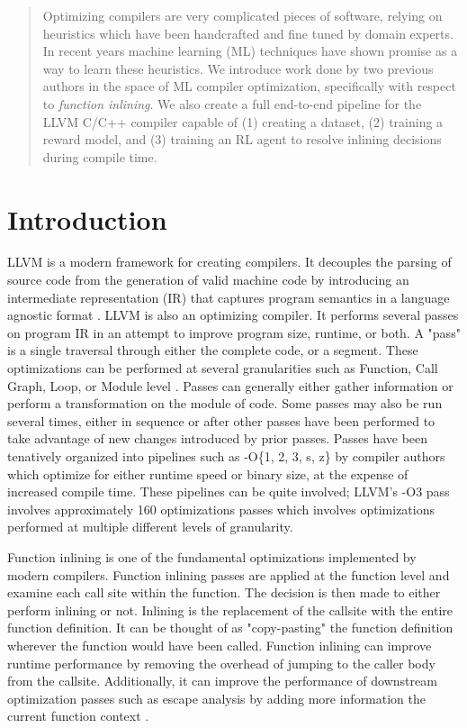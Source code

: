 \documentclass[nohyperref]{article}
\theoremstyle{plain}
\theoremstyle{definition}
\theoremstyle{remark}
\begin{document}
\begin{abstract}
    Optimizing compilers are very complicated pieces of software, relying on heuristics which have been handcrafted and fine tuned by domain experts. In recent years machine learning (ML) techniques have shown promise as a way to learn these heuristics. We introduce work done by two previous authors in the space of ML compiler optimization, specifically with respect to \emph{function inlining}. We also create a full end-to-end pipeline for the LLVM C/C++ compiler capable of (1) creating a dataset, (2) training a reward model, and (3) training an RL agent to resolve inlining decisions during compile time.

\end{abstract}

\section{Introduction}
\label{introduction}
LLVM is a modern framework for creating compilers. It decouples the parsing of source code from the generation of valid machine code by introducing an intermediate representation (IR) that captures program semantics in a language agnostic format \cite{llvm-paper}. LLVM is also an optimizing compiler. It performs several passes on program IR in an attempt to improve program size, runtime, or both. A "pass" is a single traversal through either the complete code, or a segment. These optimizations can be performed at several granularities such as Function, Call Graph, Loop, or Module level \cite{llvm-paper}. Passes can generally either gather information or perform a transformation on the module of code. Some passes may also be run several times, either in sequence or after other passes have been performed to take advantage of new changes introduced by prior passes. Passes have been tenatively organized into pipelines such as -O\{1, 2, 3, s, z\} by compiler authors which optimize for either runtime speed or binary size, at the expense of increased compile time. These pipelines can be quite involved; LLVM's -O3 pass involves approximately 160 optimizations passes which involves optimizations performed at multiple different levels of granularity.


Function inlining is one of the fundamental optimizations implemented by modern compilers. Function inlining passes are applied at the function level and examine each call site within the function. The decision is then made to either perform inlining or not. Inlining is the replacement of the callsite with the entire function definition. It can be thought of as "copy-pasting" the function definition wherever the function would have been called. Function inlining can improve runtime performance by removing the overhead of jumping to the caller body from the callsite. Additionally, it can improve the performance of downstream optimization passes such as escape analysis by adding more information the current function context \cite{Theodoridis_Grosser_Su_2022}.
\end{document}

